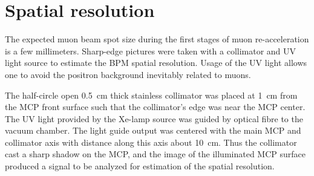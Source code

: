 \documentclass[preprint,3p,twocolumn]{elsarticle}
\begin{document}
\section{Spatial resolution}
 
The expected muon beam spot size during the first stages of muon
re-acceleration is a few millimeters.  Sharp-edge pictures were
taken with a collimator and UV light source to estimate the BPM
spatial resolution.  Usage of the UV light allows one to avoid
the positron background inevitably related to muons.

The half-circle open \SI{.5}{\cm} thick stainless collimator was
placed at \SI{1}{\cm} from the MCP front surface such that the
collimator's edge was near the MCP center.  The UV light provided
by the Xe-lamp source was guided by optical fibre to the
vacuum chamber.  The light guide output was centered with the main
MCP and collimator axis with distance along this axis about
%
%
\SI{10}{\cm}.  Thus the collimator cast a sharp shadow on the
MCP, and the image of the illuminated MCP surface produced a
signal to be analyzed for estimation of the spatial resolution.
\end{document}
